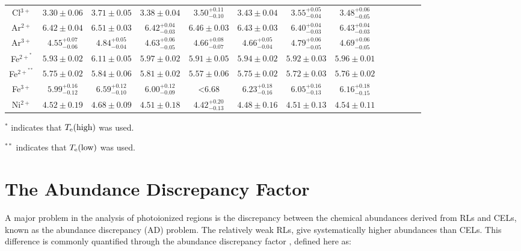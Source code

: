 \documentclass[fleqn,usenatbib]{mnras}
\begin{document}
\begin{table*}
\begin{adjustbox}{width=\textwidth}
\begin{tabular}{ccccccccccccc}
Cl$^{3+}$ & $3.30 \pm 0.06$ & $3.71 \pm 0.05 $ & $3.38 \pm 0.04$ & $3.50^{+0.11} _{-0.10}$  & $3.43 \pm 0.04$ & $3.55^{+0.05} _{-0.04}$ & $3.48^{+0.06} _{-0.05}$    \\

Ar$^{2+}$ & $6.42 \pm 0.04$ & $6.51 \pm 0.03 $ & $6.42^{+0.04} _{-0.03}$ & $6.46 \pm 0.03 $   & $6.43 \pm 0.03$ & $6.40^{+0.04} _{-0.03}$ & $6.43^{+0.04} _{-0.03}$  \\

Ar$^{3+}$ & $4.55^{+0.07} _{-0.06}$ & $4.84^{+0.05} _{-0.04}$ & $4.63^{+0.06} _{-0.05}$ & $4.66^{+0.08} _{-0.07}$  & $4.66^{+0.05} _{-0.04}$ & $4.79^{+0.06} _{-0.05}$ & $4.69^{+0.06} _{-0.05}$  \\

Fe$^{{2+}^{*}}$ & $5.93 \pm 0.02$& $6.11 \pm 0.05$ &$5.97 \pm 0.02$& $5.91 \pm 0.05$ &$5.94 \pm 0.02$&$5.92 \pm 0.03$&$5.96 \pm 0.01$\\

Fe$^{{2+}^{**}}$ & $5.75 \pm 0.02$& $5.84 \pm 0.06$ &$5.81 \pm 0.02$&  $5.57 \pm 0.06$  &$5.75 \pm 0.02$&$5.72 \pm 0.03$&$5.76 \pm 0.02$\\

Fe$^{3+}$ & $5.99^{+0.16} _{-0.12}$ & $6.59^{+0.12} _{-0.10}$ & $6.00^{+0.12} _{-0.09}$ & <6.68 & $6.23^{+0.18} _{-0.16}$ & $6.05^{+0.16} _{-0.13}$ & $6.16^{+0.18} _{-0.15}$  \\

Ni$^{2+}$ & $4.52 \pm 0.19$& $4.68 \pm 0.09$ & $4.51 \pm 0.18$&  $4.42^{+0.20} _{-0.13}$ &$4.48 \pm 0.16$&$4.51 \pm 0.13$&$4.54 \pm 0.11$\\

\hline
\end{tabular}
\end{adjustbox}
\begin{description}
\item $^*$ indicates that $T_{\rm e} (\text{high})$ was used. \\
\item $^{**}$ indicates that $T_{\rm e} (\text{low})$ was used. \\
\end{description}
\end{table*}


\section{The Abundance Discrepancy Factor}
\label{sec:ADF}

A major problem in the analysis of photoionized regions is the discrepancy between the chemical abundances derived from RLs and CELs, known as the abundance discrepancy (AD) problem. The relatively weak RLs, give systematically higher abundances than CELs. This difference is commonly quantified through the abundance discrepancy factor \citep[ADF, ][]{liu00}, defined here as:
\end{document}

